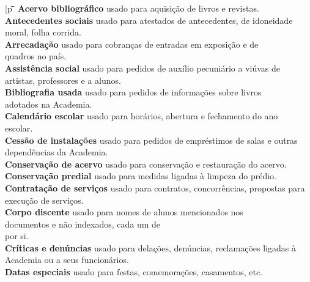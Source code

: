 \begin{tabbing}{|p}
	\hspace{0.7cm}\=\hspace{4.7cm}\=\hspace{3cm}\=\kill
	\textbf{Acervo bibliográfico}	\>  \> usado para \> aquisição de livros e revistas.\\
	\textbf{Antecedentes sociais} \>\>usado para \> atestados de antecedentes, de idoneidade\\
		\>\> \> moral, folha corrida.\\
	\textbf{Arrecadação}	\>\>usado para \> cobranças de entradas em exposição e de\\
		\>\> \> quadros no país.\\
	\textbf{Assistência social} \>\>usado para \> pedidos de auxílio pecuniário a viúvas de\\
		\>\> \> artistas, professores e a alunos.\\
	\textbf{Bibliografia usada}	\>\>usado para \> pedidos de informações sobre livros\\
		\>\> \> adotados na Academia.\\
	\textbf{Calendário escolar} \>\>usado para \> horários, abertura e fechamento do ano\\
		\>\> \> escolar.\\
	\textbf{Cessão de instalações} \>\>usado para \> pedidos de empréstimos de salas e outras\\
		\>\> \> dependências da Academia.\\
	\textbf{Conservação de acervo} \>\>usado para \> conservação e restauração do acervo.\\
	\textbf{Conservação predial}	\>\>usado para \> medidas ligadas à limpeza do prédio.\\
	\textbf{Contratação de serviços} \>\>usado para \> contratos, concorrências, propostas para\\
		\>\> \> execução de serviços.\\
	\textbf{Corpo discente} \>\>usado para \> nomes de alunos mencionados nos\\
		\>\> \> documentos e não indexados, cada um de\\
		\>\> \> por si.\\
	\textbf{Críticas e denúncias} \>\>usado para \> delações, denúncias, reclamações ligadas à\\
	\>\> \> Academia ou a seus funcionários.\\
	\textbf{Datas especiais} \>\>usado para \> festas, comemorações, casamentos, etc.\\

\end{tabbing}
